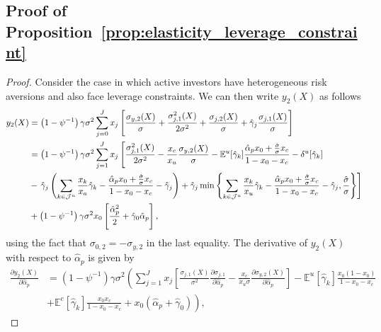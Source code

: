 \subsection{Proof of Proposition~\ref{prop:elasticity_leverage_constraint}}\label{app:prop_elasticity_leverage_constraint}
\begin{proof}
	Consider the case in which active investors have heterogeneous risk aversions and also face leverage constraints. We can then write $y_2(X)$ as follows
	\begin{align}
	y_2(X) &=  \left(1-\psi^{-1}\right) \gamma \sigma^2 \sum_{j=0}^J x_{j} \left[\frac{\sigma_{y,2}(X)}{\sigma}+ \frac{\sigma_{j,1}^2(X)}{2 \sigma^2} +\frac{ \sigma_{j,2}(X)}{\sigma} + \hat{\gamma}_j \frac{\sigma_{j,1}(X)}{\sigma}  \right] \nonumber\\
	&=\left(1-\psi^{-1}\right) \gamma \sigma^2 \sum_{j=1}^J x_{j} \left[\frac{\sigma_{j,1}^2(X)}{2 \sigma^2}-\frac{ x_c}{x_u}\frac{\sigma_{y,2}(X)}{\sigma}-\mathbb{E}^u[\hat{\gamma}_k] \frac{ \hat{\alpha}_p x_0+ \frac{\hat{\sigma}}{\sigma}x_c }{1-x_0-x_c} -\var^u[\hat{\gamma}_k]  \right.\nonumber\\
	&-\left. \hat{\gamma}_j \left(\sum_{k\in\mathcal{J}^u} \frac{x_k}{x_a} \hat{\gamma}_k -\frac{\hat{\alpha}_p  x_0 + \frac{\hat{\sigma}}{\sigma} x_c}{1-x_0-x_c}-\hat{\gamma}_j\right)+\hat{\gamma}_j \min\left\{ \sum_{k\in\mathcal{J}^u} \frac{x_k}{x_u} \hat{\gamma}_k -\frac{\hat{\alpha}_p  x_0+\frac{\hat{\sigma}}{\sigma} x_c }{1-x_0-x_c}- \hat{\gamma}_j  ,\frac{\hat{\sigma}}{\sigma}  \right\}  \right] \nonumber \\
	&+\left(1-\psi^{-1}\right) \gamma \sigma^2 x_0 \left[ \frac{\hat{\alpha}_p^2}{2} + \hat{\gamma}_0 \hat{\alpha}_p \right],
	\end{align}
	using the fact that $\sigma_{0,2} = -\sigma_{y,2}$ in the last equality.
	The derivative of $y_2(X)$ with respect to $\hat{\alpha}_p$ is given by 
	\begin{align}
	\frac{\partial y_2(X)}{\partial \hat{\alpha}_p}   &=\left(1-\psi^{-1}\right) \gamma \sigma^2 \left(\sum_{j=1}^J x_{j} \left[\frac{\sigma_{j,1}(X)}{ \sigma^2} \frac{\partial \sigma_{j,1}}{\partial \hat{\alpha}_p}-\frac{ x_c}{x_u \sigma}\frac{\partial \sigma_{y,2}(X)}{\partial \hat{\alpha}_p}\right]-\mathbb{E}^u[\hat{\gamma}_k] \frac{  x_0 (1-x_0)}{1-x_0-x_c}\right. \nonumber\\
	&\left. +\mathbb{E}^c[\hat{\gamma}_k] \frac{  x_0 x_c }{1-x_0-x_c} + x_0 (\hat{\alpha}_p+ \hat{\gamma}_0) \right), \nonumber 
	\end{align}

\end{proof}
